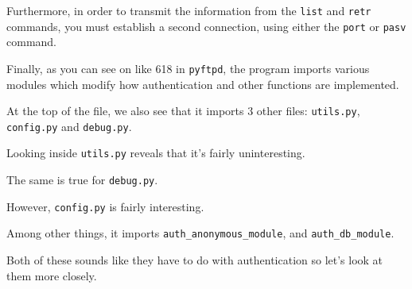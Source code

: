 {{{Furthermore, in order to transmit the information from the \lstinline`list` and \lstinline`retr` commands, you must establish a second connection, using either the \lstinline`port` or \lstinline`pasv` command. 















                    Finally, as you can see on like 618 in \lstinline`pyftpd`, the program imports various modules which modify how authentication and other functions are implemented. %







At the top of the file, we also see that it imports 3 other files: \lstinline`utils.py`, \lstinline`config.py` and \lstinline`debug.py`. %







Looking inside \lstinline`utils.py` reveals that it's fairly uninteresting. %







The same is true for \lstinline`debug.py`. %







However, \lstinline`config.py` is fairly interesting. %







Among other things, it imports \lstinline`auth_anonymous_module`, and \lstinline`auth_db_module`. 















                    Both of these sounds like they have to do with authentication so let's look at them more closely. %







}}}
